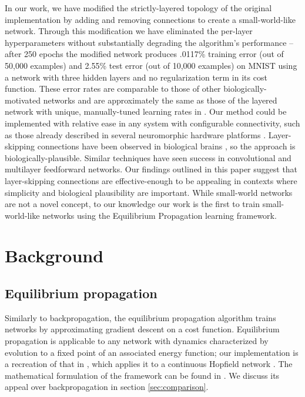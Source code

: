 \documentclass[utf8]{frontiersSCNS}
\begin{document}
In our work, we have modified the strictly-layered topology of the original implementation by adding and removing connections to create a small-world-like network\citep{watts98}. Through this modification we have eliminated the per-layer hyperparameters without substantially degrading the algorithm's performance -- after 250 epochs the modified network produces .0117\% training error (out of 50,000 examples) and 2.55\% test error (out of 10,000 examples) on MNIST using a network with three hidden layers and no regularization term in its cost function. These error rates are comparable to those of other biologically-motivated networks \citep{bartunov2018} and are approximately the same as those of the layered network with unique, manually-tuned learning rates in \citep{scellier17}. Our method could be implemented with relative ease in any system with configurable connectivity, such as those already described in several neuromorphic hardware platforms \citep{davies2018, schemmel2010, shainline2019}. Layer-skipping connections have been observed in biological brains \citep{bullmore2009}, so the approach is biologically-plausible. Similar techniques have seen success in convolutional \citep{he2015, srivastava2015} and multilayer feedforward \citep{xiaohu2011, krishnan2019} networks. Our findings outlined in this paper suggest that layer-skipping connections are effective-enough to be appealing in contexts where simplicity and biological plausibility are important. While small-world networks are not a novel concept, to our knowledge our work is the first to train small-world-like networks using the Equilibrium Propagation learning framework.

\section{Background}

\subsection{Equilibrium propagation}
\label{sec:eqp_formulation}

Similarly to backpropagation, the equilibrium propagation algorithm \citep{scellier17} trains networks by approximating gradient descent on a cost function. Equilibrium propagation is applicable to any network with dynamics characterized by evolution to a fixed point of an associated energy function; our implementation is a recreation of that in \citep{scellier17}, which applies it to a continuous Hopfield network \citep{hopfield1984}. The mathematical formulation of the framework can be found in \citep{scellier17}. We discuss its appeal over backpropagation in section \ref{sec:comparison}.
\end{document}
